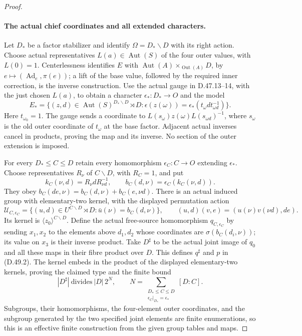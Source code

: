 \begin{proof}
\paragraph{The actual chief coordinates and all extended characters.}
Let \(D_*\) be a factor stabilizer and identify
\(\Omega=D_*\backslash D\) with its right action.
Choose actual representatives \(L(a)\in\operatorname{Aut}(S)\) of
the four outer values, with \(L(0)=1\).
Centerlessness identifies \(E\) with
\(\operatorname{Aut}(A)\times_{\operatorname{Out}(A)}D\), by
\(e\mapsto(\operatorname{Ad}_e,\pi(e))\); a lift of the base value,
followed by the required inner correction, is the inverse construction.
Use the actual gauge in D.47.13--14, with the just chosen \(L(a)\),
to obtain a character \(\epsilon_*:D_*\to O\) and the model
\[
 E_*=
 \{(z,d)\in\operatorname{Aut}(S)^{D_*\backslash D}\rtimes D:
       \epsilon(z(\omega))=\epsilon_*(t_\omega d t_{\omega d}^{-1})\}.
 \tag{D.49.16}
\]
Here \(t_{\omega_0}=1\). The gauge sends a coordinate to
\(L(s_\omega)z(\omega)L(s_{\omega d})^{-1}\), where
\(s_\omega\) is the old outer coordinate of \(t_\omega\) at the
base factor. Adjacent actual inverses cancel in products, proving the
map and its inverse. No section of the outer extension is imposed.

For every \(D_*\leq C\leq D\) retain every homomorphism
\(\epsilon_C:C\to O\) extending \(\epsilon_*\).
Choose representatives \(R_\nu\) of \(C\backslash D\), with
\(R_C=1\), and put
\[
 k_C(\nu,d)=R_\nu dR_{\nu d}^{-1},\qquad
 b_C(d,\nu)=\epsilon_C(k_C(\nu,d)).
 \tag{D.49.17}
\]
They obey \(b_C(de,\nu)=b_C(d,\nu)+b_C(e,\nu d)\).
There is an actual induced group with elementary-two kernel,
with the displayed permutation action
\[
 \mathcal U_{C,\epsilon_C}=
 \{(u,d)\in U^{C\backslash D}\rtimes D:
             \bar u(\nu)=b_C(d,\nu)\},\qquad
 (u,d)(v,e)=(u(\nu)v(\nu d),de).
 \tag{D.49.18}
\]
Its kernel is \(\langle z_0\rangle^{C\backslash D}\).
Define the actual free-source homomorphism \(q_{C,\epsilon_C}\)
by sending \(x_1,x_2\) to the elements above \(d_1,d_2\) whose
coordinates are \(\sigma(b_C(d_i,\nu))\); its value on \(x_3\)
is their inverse product. Take \(D^\sharp\) to be the actual joint
image of \(q_0\) and all these maps in their fibre product over \(D\).
This defines \(q^\sharp\) and \(p\) in \textup{(D.49.2)}.
The kernel embeds in the product of the displayed elementary-two
kernels, proving the claimed type and the finite bound
\[
 |D^\sharp|\ \text{divides}\ |D|\,2^N,
 \qquad
 N=\sum_{\substack{D_*\leq C\leq D\\
                  \epsilon_C|_{D_*}=\epsilon_*}}[D:C].
 \tag{D.49.19}
\]
Subgroups, their homomorphisms, the four-element outer coordinates,
and the subgroup generated by the two specified joint elements are
finite enumerations, so this is an effective finite construction from
the given group tables and maps.


\end{proof}
